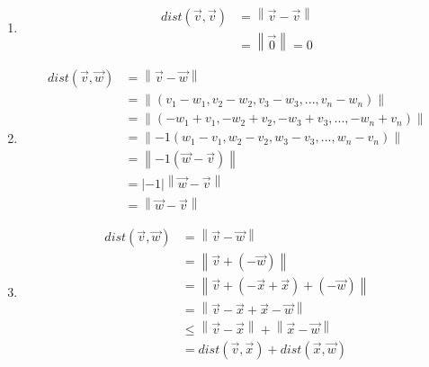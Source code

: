 \documentclass[12pt]{article}
\newcommand{\norm}[1]{\left\lVert#1\right\rVert}
\newenvironment{problem}[2][Problem]{\begin{trivlist}
\item[\hskip \labelsep {\bfseries #1}\hskip \labelsep {\bfseries #2.}]}{\end{trivlist}}
\begin{document}
\begin{enumerate}
	\item[a)] 
	\begin{align*}
		dist(\vec{v}, \vec{v}) &= \norm{\vec{v} - \vec{v}}\\
		&= \norm{\vec{0}} = 0
	\end{align*}
	\item[b)]
	\begin{align*}
		dist(\vec{v}, \vec{w}) &= \norm{\vec{v} - \vec{w}}\\
		&= \norm{(v_1 - w_1, v_2 - w_2, v_3 - w_3, ..., v_n - w_n)}\\
		&= \norm{(-w_1 + v_1, -w_2 + v_2, -w_3 + v_3, ..., -w_n + v_n)}\\
		&= \norm{-1(w_1 - v_1, w_2 - v_2, w_3 - v_3, ..., w_n - v_n)}\\
		&= \norm{-1(\vec{w} - \vec{v})}\\
		&= |-1| \norm{\vec{w} - \vec{v}}\\
		&= \norm{\vec{w} - \vec{v}}
	\end{align*}
	\item[c)]
	\begin{align*}
		dist(\vec{v}, \vec{w}) &= \norm{\vec{v} - \vec{w}}\\
		&= \norm{\vec{v} + (-\vec{w})}\\
		&= \norm{\vec{v} + (-\vec{x} + \vec{x}) + (-\vec{w})}\\
		&= \norm{\vec{v} -\vec{x} + \vec{x} - \vec{w}}\\
		&\leq \norm{\vec{v} -\vec{x}} + \norm{\vec{x} - \vec{w}}\\
		&= dist(\vec{v}, \vec{x}) + dist(\vec{x}, \vec{w})
	\end{align*}
\end{enumerate}

\begin{problem}{4}
\end{problem}


\begin{problem}{5}
\end{problem}
\end{document}

